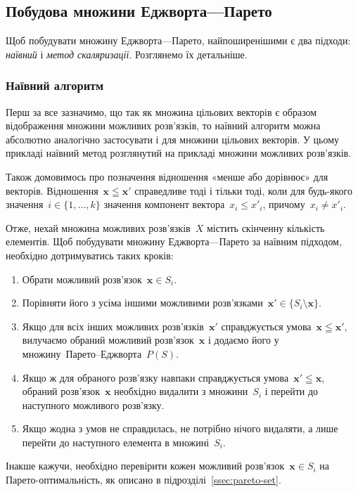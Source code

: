 \documentclass[
  a4paper,
  oneside,
  BCOR = 10mm,
  DIV = 12,
  12pt,
  headings = normal,
]{scrartcl}
\newcommand{\vect}[1]{\mathbf{#1}}
\begin{document}
    \subsection{Побудова множини Еджворта—Парето}
      Щоб побудувати множину Еджворта—Парето, найпоширенішими є два підходи: \emph{наївний} і \emph{метод скаляризації}. Розглянемо їх детальніше.

      \subsubsection{Наївний алгоритм}
        Перш за все зазначимо, що так як множина цільових векторів є образом відображення множини можливих розв'язків, то наївний алгоритм можна абсолютно аналогічно застосувати і для множини цільових векторів. У цьому прикладі наївний метод розглянутий на прикладі множини можливих розв'язків.

        Також домовимось про позначення відношення «менше або дорівнює» для векторів. Відношення~$\vect{x} \leqq \vect{x'}$ справедливе тоді і тільки тоді, коли для будь-якого значення~$i \in \{1, \dots, k\}$ значення компонент вектора~$x_{i} \leqslant x'_{i}$, причому~$x_{i} \neq x'_{i}$.

        Отже, нехай множина можливих розв'язків~$X$ містить скінченну кількість елементів. Щоб побудувати множину Еджворта—Парето за наївним підходом, необхідно дотримуватись таких кроків:
        \begin{enumerate}
          \item Обрати можливий розв'язок~$\vect{x} \in S_i$.
          \item Порівняти його з усіма іншими можливими розв'язками~$\vect{x'} \in \{ S_i \setminus \vect{x} \}$.
          \item Якщо для всіх інших можливих розв'язків~$\vect{x'}$ справджується умова~$\vect{x} \leqq \vect{x'}$, вилучаємо обраний можливий розв'язок~$\vect{x}$ і додаємо його у множину~Парето–Еджворта~$P(S)$.
          \item Якщо ж для обраного розв'язку навпаки справджується умова~$\vect{x'} \leqq \vect{x}$, обраний розв'язок~$\vect{x}$ необхідно видалити з множини~$S_i$ і перейти до наступного можливого розв'язку.
          \item Якщо жодна з умов не справдилась, не потрібно нічого видаляти, а лише перейти до наступного елемента в множині~$S_i$.
        \end{enumerate}
        Інакше кажучи, необхідно перевірити кожен можливий розв'язок~$\vect{x} \in S_i$ на Парето-оптимальність, як описано в підрозділі~\ref{ssec:pareto-set}.
\end{document}
